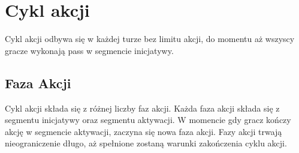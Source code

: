 

\section{Cykl akcji}
Cykl akcji odbywa się w każdej turze bez limitu akcji, do momentu aż wszyscy gracze wykonają pass w segmencie inicjatywy.


	\subsection{Faza Akcji}
	Cykl akcji składa się z różnej liczby faz akcji. Każda faza akcji składa się z segmentu inicjatywy oraz segmentu aktywacji. W momencie gdy gracz kończy akcję w segmencie aktywacji, zaczyna się nowa faza akcji. Fazy akcji trwają nieograniczenie długo, aż spełnione zostaną warunki zakończenia cyklu akcji.
